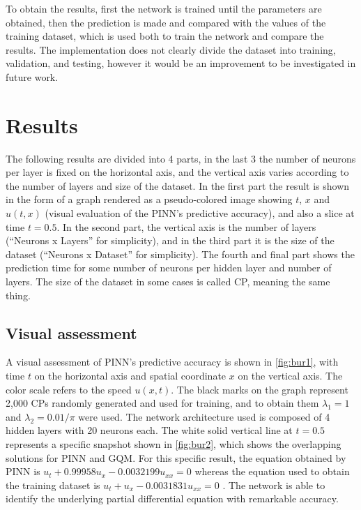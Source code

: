 \documentclass[conference]{IEEEtran}
\begin{document}
To obtain the results, first the network is trained until the parameters are obtained, then the prediction is made and compared with the values of the training dataset, which is used both to train the network and compare the results. The implementation does not clearly divide the dataset into training, validation, and testing, however it would be an improvement to be investigated in future work.

\section{Results}\label{sec:resu}

The following results are divided into 4 parts, in the last 3 the number of neurons per layer is fixed on the horizontal axis, and the vertical axis varies according to the number of layers and size of the dataset. In the first part the result is shown in the form of a graph rendered as a pseudo-colored image showing $t$, $x$ and $u(t,x)$ (visual evaluation of the PINN's predictive accuracy), and also a slice at time $t=0.5$. In the second part, the vertical axis is the number of layers (“Neurons x Layers” for simplicity), and in the third part it is the size of the dataset (“Neurons x Dataset” for simplicity). The fourth and final part shows the prediction time for some number of neurons per hidden layer and number of layers. The size of the dataset in some cases is called CP, meaning the same thing.

\subsection{Visual assessment}

A visual assessment of PINN's predictive accuracy is shown in \autoref{fig:bur1}, with time $t$ on the horizontal axis and spatial coordinate $x$ on the vertical axis. The color scale refers to the speed $u(x,t)$. The black marks on the graph represent 2,000 CPs randomly generated and used for training, and to obtain them $ \lambda_1 = 1 $ and $ \lambda_2 = 0.01/\pi $ were used. The network architecture used is composed of 4 hidden layers with 20 neurons each. The white solid vertical line at $t=0.5$ represents a specific snapshot shown in \autoref {fig:bur2}, which shows the overlapping solutions for PINN and GQM. For this specific result, the equation obtained by PINN is $u_t + 0.99958 u_x - 0.0032199 u_{xx} = 0$ whereas the equation used to obtain the training dataset is $u_t + u_x - 0.0031831 u_{xx} = 0$ . The network is able to identify the underlying partial differential equation with remarkable accuracy.
\end{document}
